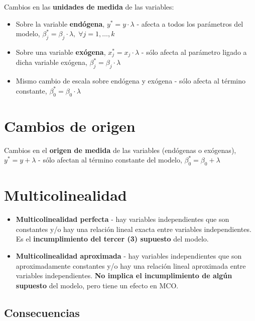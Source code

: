 \documentclass[10pt, a4paper, landscape]{extarticle}
\begin{document}
\begin{multicols}{3}
Cambios en las \textbf{unidades de medida} de las variables:

\begin{itemize}[leftmargin=*]
	\item Sobre la variable \textbf{endógena}, $y^* = y \cdot \lambda$ - afecta a todos los parámetros del modelo, $\beta_j^* = \beta_j \cdot \lambda, \; \forall j = 1, \ldots, k$
	\item Sobre una variable \textbf{exógena}, $x_j^* = x_j \cdot \lambda$ - sólo afecta al parámetro ligado a dicha variable exógena, $\beta_j^* = \beta_j \cdot \lambda$
	\item Mismo cambio de escala sobre endógena y exógena - sólo afecta al término constante, $\beta_0^* = \beta_0 \cdot \lambda$
\end{itemize}

\section*{Cambios de origen}

Cambios en el \textbf{origen de medida} de las variables (endógenas o exógenas), $y^* = y + \lambda$ - sólo afectan al término constante del modelo, $\beta_0^* = \beta_0 + \lambda$

\columnbreak

\section*{Multicolinealidad}

\begin{itemize}[leftmargin=*]
	\item \textbf{Multicolinealidad perfecta} - hay variables independientes que son constantes y/o hay una relación lineal exacta entre variables independientes. Es el \textbf{incumplimiento del tercer (3) supuesto} del modelo.
	\item \textbf{Multicolinealidad aproximada} - hay variables independientes que son aproximadamente constantes y/o hay una relación lineal aproximada entre variables independientes. \textbf{No implica el incumplimiento de algún supuesto} del modelo, pero tiene un efecto en MCO.
\end{itemize}

\subsection*{Consecuencias}


\end{multicols}
\end{document}
